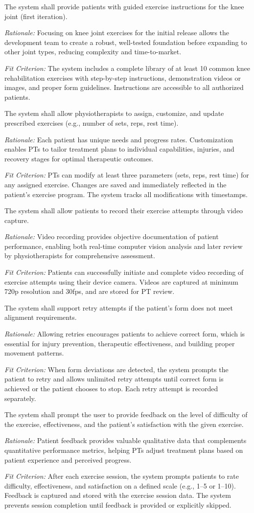 \documentclass[12pt]{article}
\newcommand{\rationale}[1]{\par\emph{Rationale:} #1}
\newcommand{\fitcrit}[1]{\par\emph{Fit Criterion:} #1}
\begin{document}
\begin{reqlist}
	\item[FR 5.] The system shall provide patients with guided exercise instructions for the knee joint (first iteration).
	\rationale{Focusing on knee joint exercises for the initial release allows the development team to create a robust, well-tested foundation before expanding to other joint types, reducing complexity and time-to-market.}
	\fitcrit{The system includes a complete library of at least 10 common knee rehabilitation exercises with step-by-step instructions, demonstration videos or images, and proper form guidelines. Instructions are accessible to all authorized patients.}
	
	\item[FR 6.] The system shall allow physiotherapists to assign, customize, and update prescribed exercises (e.g., number of sets, reps, rest time).
	\rationale{Each patient has unique needs and progress rates. Customization enables PTs to tailor treatment plans to individual capabilities, injuries, and recovery stages for optimal therapeutic outcomes.}
	\fitcrit{PTs can modify at least three parameters (sets, reps, rest time) for any assigned exercise. Changes are saved and immediately reflected in the patient's exercise program. The system tracks all modifications with timestamps.}
	
	\item[FR 7.] The system shall allow patients to record their exercise attempts through video capture.
	\rationale{Video recording provides objective documentation of patient performance, enabling both real-time computer vision analysis and later review by physiotherapists for comprehensive assessment.}
	\fitcrit{Patients can successfully initiate and complete video recording of exercise attempts using their device camera. Videos are captured at minimum 720p resolution and 30fps, and are stored for PT review.}
	
	\item[FR 8.] The system shall support retry attempts if the patient's form does not meet alignment requirements.
	\rationale{Allowing retries encourages patients to achieve correct form, which is essential for injury prevention, therapeutic effectiveness, and building proper movement patterns.}
	\fitcrit{When form deviations are detected, the system prompts the patient to retry and allows unlimited retry attempts until correct form is achieved or the patient chooses to stop. Each retry attempt is recorded separately.}
	
	\item[FR 9.] The system shall prompt the user to provide feedback on the level of difficulty of the exercise, effectiveness, and the patient's satisfaction with the given exercise.
	\rationale{Patient feedback provides valuable qualitative data that complements quantitative performance metrics, helping PTs adjust treatment plans based on patient experience and perceived progress.}
	\fitcrit{After each exercise session, the system prompts patients to rate difficulty, effectiveness, and satisfaction on a defined scale (e.g., 1--5 or 1--10). Feedback is captured and stored with the exercise session data. The system prevents session completion until feedback is provided or explicitly skipped.}
	

\end{reqlist}
\end{document}
